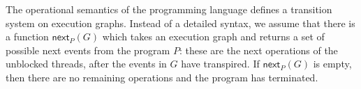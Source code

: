 \documentclass[acmsmall]{acmart}
\def\RM#1{{\textcolor{red}{\textbf{RM:} #1}}}
\def\UM#1{{\textcolor{green!80!black}{\textbf{UM:} #1}}}
\renewcommand{\RM}[1]{}
\renewcommand{\UM}[1]{}
\newcommand{\nextop}{\mathsf{next}}
\begin{document}

The operational semantics of the programming language defines a transition system on execution graphs.
Instead of a detailed syntax, we assume that there is a function $\nextop_P(G)$ which takes
an execution graph and returns a 
set of possible next events from the program $P$: these are the next operations
of the unblocked threads, after the events in $G$ have transpired.
If $\nextop_P(G)$ is empty, then there are no remaining operations and the program has terminated. 
\end{document}
